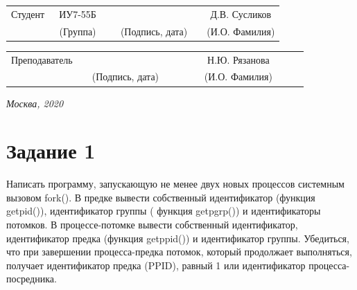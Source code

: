 \documentclass[14pt, a4paper]{extarticle}
\begin{document}
	
	\noindent
	\\
	
	\noindent
	\\
	
	\vspace{1.5cm}
	\noindent
	\begin{tabular}{l c c c c c}
		Студент      & ~ИУ7-55Б~               & \hspace{2.5cm} & \hspace{2cm}                 & &  Д.В. 
		Сусликов \\\cline{2-2}\cline{4-4} \cline{6-6} 
		\hspace{3cm} & {\footnotesize(Группа)} &                & {\footnotesize(Подпись, дата)} & & {\footnotesize(И.О. Фамилия)}
	\end{tabular}
	
	\noindent
	\begin{tabular}{l c c c c}
		Преподаватель & \hspace{5cm}   & \hspace{2cm}                 & & ~~~~~~Н.Ю. Рязанова~~~~~~\\\cline{3-3} \cline{5-5} 
		\hspace{3cm}  &                & {\footnotesize(Подпись, дата)} & & {\footnotesize(И.О. Фамилия)}
	\end{tabular}
	
	\vspace{0.6cm}
	\begin{center}	
		\vfill
		\large \textit {Москва, 2020}
	\end{center}
	
	\thispagestyle {empty}
	\pagebreak
	
	\clearpage
	\tableofcontents
	
	
	\clearpage
	\section*{Задание 1}
	Написать программу, запускающую не менее двух новых процессов системным вызовом fork(). В предке вывести собственный идентификатор (функция getpid()), идентификатор группы ( функция getpgrp()) и идентификаторы потомков. В процессе-потомке вывести собственный идентификатор, идентификатор предка (функция getppid()) и идентификатор группы. Убедиться, что при завершении процесса-предка потомок, который продолжает выполняться, получает идентификатор предка (PPID), равный 1 или идентификатор процесса-посредника.\par
	
\end{document}

